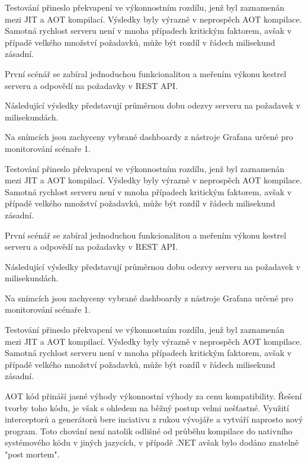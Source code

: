 Testování přineslo překvapení ve výkonnostním rozdílu, jenž byl zaznamenán mezi JIT a AOT kompilací. Výsledky byly výrazně v neprospěch AOT kompilace. Samotná rychlost serveru není v mnoha případech kritickým faktorem, avšak v případě velkého množství požadavků, může být rozdíl v řádech milisekund zásadní.


První scénář se zabíral jednoduchou funkcionalitou a meřením výkonu kestrel serveru a odpovědí na požadavky v REST API.


Následující výsledky představují průměrnou dobu odezvy serveru na požadavek v milisekundách. 

Na snímcích jsou zachyceny vybrané dashboardy z nástroje Grafana určené pro monitorování scénaře 1. 


Testování přineslo překvapení ve výkonnostním rozdílu, jenž byl zaznamenán mezi JIT a AOT kompilací. Výsledky byly výrazně v neprospěch AOT kompilace. Samotná rychlost serveru není v mnoha případech kritickým faktorem, avšak v případě velkého množství požadavků, může být rozdíl v řádech milisekund zásadní.


První scénář se zabíral jednoduchou funkcionalitou a meřením výkonu kestrel serveru a odpovědí na požadavky v REST API.


Následující výsledky představují průměrnou dobu odezvy serveru na požadavek v milisekundách. 

Na snímcích jsou zachyceny vybrané dashboardy z nástroje Grafana určené pro monitorování scénaře 1. 


Testování přineslo překvapení ve výkonnostním rozdílu, jenž byl zaznamenán mezi JIT a AOT kompilací. Výsledky byly výrazně v neprospěch AOT kompilace. Samotná rychlost serveru není v mnoha případech kritickým faktorem, avšak v případě velkého množství požadavků, může být rozdíl v řádech milisekund zásadní.


AOT kód přináší jasné výhody výkonnostní výhody za cenu kompatibility. Řešení tvorby toho kódu, je však s ohledem na běžný postup velmi nešťastné. Využití interceptorů a generátorů bere inciativu z rukou vývojáře a vytváří naprosto nový program. Toto chování není natolik odlišné od průběhu kompilace do nativního systémového kódu v jiných jazycích, v případě .NET avšak bylo dodáno znatelně "post mortem".

